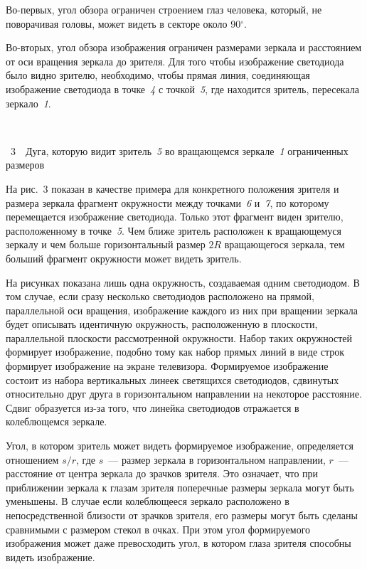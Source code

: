 \begin{multicols}{2}
  Во-первых, угол обзора ограничен строением глаз человека, который, не поворачивая 
головы, может видеть в секторе около 90$^\circ$. 
  
  Во-вторых, угол обзора изображения ограничен размерами зеркала и расстоянием от 
оси вращения зеркала до зрителя. Для того чтобы изображение светодиода было видно 
зрителю, необходимо, чтобы прямая линия, соединяющая изображение светодиода в 
точке~\textit{4} с точкой~\textit{5}, где находится зритель, пересекала зеркало~\textit{1}. 


\begin{center}
\vspace*{3pt}

\mbox{%
\epsfxsize=41.685mm
}
\end{center}
{{\figurename~3}\ \ \small{Дуга, которую видит зритель~\textit{5} во вращающемся зеркале~\textit{1} 
ограниченных размеров}}


\bigskip
\addtocounter{figure}{1}  
 
  
  На рис.~3 %
  показан в качестве примера для конкретного положения зрителя и 
размера зеркала фрагмент окружности между точками~\textit{6} и~\textit{7}, по
которому 
перемещается изображение светодиода. Только этот фрагмент виден зрителю, 
расположенному в точке~\textit{5}. Чем ближе зритель расположен к вращающемуся 
зеркалу и чем больше горизонтальный размер $2R$ вращающегося зеркала, тем больший 
фрагмент окружности может видеть зритель. 
  
  На рисунках показана лишь одна окружность, создаваемая одним светодиодом. В том 
случае, если сразу несколько светодиодов расположено на прямой, параллельной оси 
вращения, изображение каждого из них при вращении зеркала будет описывать 
идентичную окружность, расположенную в плоскости, параллельной плоскости 
рас\-смот\-рен\-ной окружности. Набор таких окружностей формирует изображение, подобно 
тому как набор прямых линий в виде строк формирует изображение на экране телевизора. 
Формируемое изображение состоит из набора вертикальных линеек светящихся 
светодиодов, сдвинутых относительно друг друга в горизонтальном направлении на 
некоторое расстояние. Сдвиг образуется из-за того, что линейка светодиодов отражается в 
колеблющемся зеркале.
  
  Угол, в котором зритель может видеть формируемое изображение, определяется 
отношением $s/r$, где $s$~--- размер зеркала в горизонтальном направлении, $r$~--- 
расстояние от центра зеркала до зрачков зрителя. Это означает, что при приближении 
зеркала к глазам зрителя поперечные размеры зеркала могут быть уменьшены. В случае 
если колеблющееся зеркало расположено в непосредственной близости от зрачков 
зрителя, его размеры могут быть сделаны сравнимыми с размером стекол в очках. При 
этом угол формируемого изображения может даже превосходить угол, в котором глаза 
зрителя способны видеть изображение. 
  

\end{multicols}
